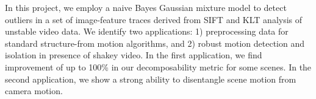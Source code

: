 In this project, we employ a naive Bayes Gaussian mixture model to detect outliers in a set of image-feature traces derived from SIFT and KLT analysis of unstable video data.  We identify two applications: 1) preprocessing data for standard structure-from motion algorithms, and 2) robust motion detection and isolation in presence of shakey video.  In the first application, we find improvement of up to 100\% in our decomposability metric for some scenes.  In the second application, we show a strong ability to disentangle scene motion from camera motion.